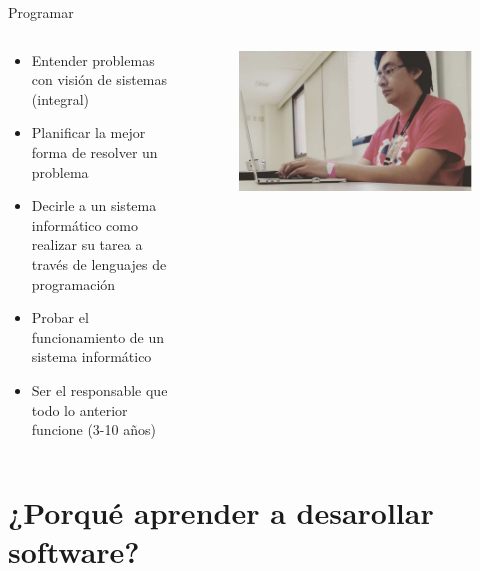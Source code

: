 \documentclass[aspectratio=169]{beamer}
\begin{document}
\begin{frame}{Programar}


    \begin{columns}[T] %
	     \begin{column}[T]{0.5\textwidth} %
			    \begin{itemize}[<+->]
                       \item Entender problemas con visión de sistemas (integral)
                       \item Planificar la mejor forma de resolver un problema
                       \item Decirle a un sistema informático como realizar su tarea a través de lenguajes de programación
                       \item Probar el funcionamiento de un sistema informático
                       \item Ser el responsable que todo lo anterior funcione (3-10 años)
                \end{itemize}
	     \end{column}
	     \begin{column}[T]{4cm} %
   			\begin{figure}
                       \centering
                       \includegraphics[width=\linewidth]{Images/yo}
                   \end{figure}

	     \end{column}
     \end{columns}
\end{frame}

\section{¿Porqué aprender a desarollar software?}
\end{document}
